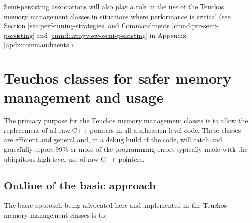 \documentclass[pdf,ps2pdf,11pt]{SANDreport}
\begin{document}
Semi-persisting associations will also play a role in the use of the
Teuchos memory management classes in situations where performance is
critical (see Section {}\ref{sec:perf-tuning-strategies} and
Commandments {}\ref{cmnd:ptr-semi-persisting} and
{}\ref{cmnd:arrayview-semi-persisting} in Appendix
{}\ref{apdx:commandments}).


%
{}\section{Teuchos classes for safer memory management and usage}
\label{sec:teuchos-mem-mng-classes}
%

The primary purpose for the Teuchos memory management classes is to
allow the replacement of all raw C++ pointers in all application-level
code.  These classes are efficient and general and, in a debug build
of the code, will catch and gracefully report 99\% or more of the
programming errors typically made with the ubiquitous high-level use
of raw C++ pointers.


%
{}\subsection{Outline of the basic approach}
{}\label{sec:outline_of_basic_approach}
%

The basic approach being advocated here and implemented in the Teuchos
memory management classes is to:
\end{document}
